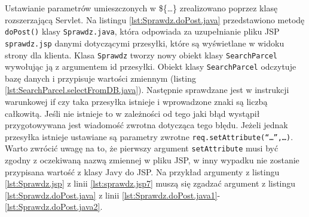 \documentclass[eng,printmode,oneside]{mgr}
\begin{document}
Ustawianie parametrów umieszczonych w \$\{\ldots\} zrealizowano
poprzez klasę rozszerzającą Servlet. Na listingu \ref{lst:Sprawdz.doPost.java}
przedstawiono metodę \texttt{doPost()} klasy \texttt{Sprawdz.java}, która odpowiada za uzupełnianie
pliku JSP \texttt{sprawdz.jsp} danymi dotyczącymi przesyłki, które są
wyświetlane w widoku strony dla klienta. Klasa \texttt{Sprawdz} tworzy nowy
obiekt klasy \texttt{SearchParcel} wywołując ją z argumentem id przesyłki.
Obiekt klasy \texttt{SearchParcel} odczytuje bazę danych i przypisuje
wartości zmiennym (listing \ref{lst:SearchParcel.selectFromDB.java}). Następnie sprawdzane
jest w instrukcji warunkowej if czy taka przesyłka istnieje i wprowadzone znaki są
liczbą całkowitą. Jeśli nie istnieje to w zależności od tego jaki błąd wystąpił
przygotowywana jest wiadomość zwrotna dotycząca tego błędu. Jeżeli jednak
przesyłka istnieje ustawiane są parametry zwrotne
\texttt{req.setAttribute(``\ldots'',\ldots)}. Warto zwrócić uwagę na to, że
pierwszy argument \texttt{setAttribute} musi być zgodny z oczekiwaną nazwą
zmiennej w pliku JSP, w inny wypadku nie zostanie przypisana wartość z klasy
Javy do JSP. Na przykład argumenty z listingu \ref{lst:Sprawdz.jsp} z linii
\ref{lst:sprawdz.jsp7} muszą się zgadzać argument z listingu
\ref{lst:Sprawdz.doPost.java} z linii \ref{lst:Sprawdz.doPost.java1}-\ref{lst:Sprawdz.doPost.java2}.
\end{document}
